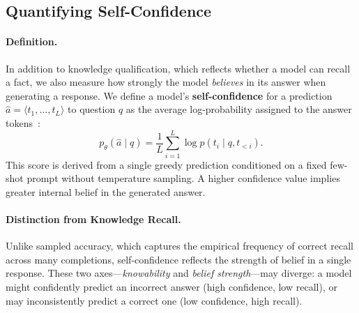 \documentclass[11pt]{article}
\begin{document}
\subsection{Quantifying Self-Confidence}

\paragraph{Definition.} In addition to knowledge qualification, which reflects whether a model can recall a fact, we also measure how strongly the model \emph{believes} in its answer when generating a response. We define a model's \textbf{self-confidence} for a prediction \(\hat{a} = \langle t_1, \dots, t_L \rangle\) to question \(q\) as the average log-probability assigned to the answer tokens~\citep{wang2022self}:
\begin{equation*}
\label{equ:confidence}
    p_\theta(\hat{a}\mid q) = \frac{1}{L} \sum_{i=1}^{L} \log p(t_i \mid q, t_{<i}).
\end{equation*}
This score is derived from a single greedy prediction conditioned on a fixed few-shot prompt without temperature sampling. A higher confidence value implies greater internal belief in the generated answer.

\paragraph{Distinction from Knowledge Recall.}  
Unlike sampled accuracy, which captures the empirical frequency of correct recall across many completions, self-confidence reflects the strength of belief in a single response. These two axes—\textit{knowability} and \textit{belief strength}—may diverge: a model might confidently predict an incorrect answer (high confidence, low recall), or may inconsistently predict a correct one (low confidence, high recall).

\end{document}
